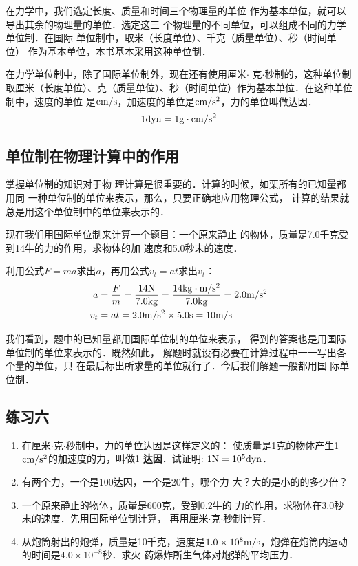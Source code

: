 在力学中，我们选定长度、质量和时间三个物理量的单位
作为基本单位，就可以导出其余的物理量的单位．选定这三
个物理量的不同单位，可以组成不同的力学单位制．在国际
单位制中，取米（长度单位）、千克（质量单位）、秒（时间单位）
作为基本单位，本书基本采用这种单位制．

在力学单位制中，除了国际单位制外，现在还有使用厘米$\cdot$
克$\cdot$秒制的，这种单位制取厘米（长度单位）、克（质量单位）、秒（时间单位）作为基本单位．在这种单位制中，速度的单位
是${\rm cm}/{\rm s}$，加速度的单位是${\rm cm}/{\rm s}^2$，力的单位叫做达因．
\[1{\rm dyn}=1{\rm g}\cdot {\rm cm}/{\rm s}^2  \]


\subsection{单位制在物理计算中的作用}
掌握单位制的知识对于物
理计算是很重要的．计算的时候，如栗所有的已知量都用同
一种单位制的单位来表示，那么，只要正确地应用物理公式，
计算的结果就总是用这个单位制中的单位来表示的．

现在我们用国际单位制来计算一个题目：一个原来静止
的物体，质量是7.0千克受到14牛的力的作用，求物体的加
速度和5.0秒末的速度．

利用公式$F= ma$求出$a$，再用公式$v_t= at$求出$v_t$：
\[\begin{split}
a&=\frac{F}{m}=\frac{14{\rm N}}{7.0{\rm kg}}=\frac{14{\rm kg}\cdot \text{m}/\text{s}^2}{7.0{\rm kg}}=2.0\text{m}/\text{s}^2\\
v_t&=at=2.0\text{m}/\text{s}^2 \times 5.0{\rm s}=10\text{m}/\text{s}
\end{split} \]

我们看到，题中的已知量都用国际单位制的单位来表示，
得到的答案也是用国际单位制的单位来表示的．既然如此，
解题时就设有必要在计算过程中一一写出各个量的单位，只
在最后标出所求量的单位就行了．今后我们解题一般都用国
际单位制．


\subsection*{练习六}
\begin{enumerate}
\item 在厘米$\cdot$克$\cdot$秒制中，力的单位达因是这样定义的：
使质量是1克的物体产生1${\rm cm}/{\rm s^2}$的加速度的力，叫做1
\textbf{达因}．试证明: $1{\rm N}=10^5{\rm dyn}$．
\item 有两个力，一个是100达因，一个是20牛，哪个力
大？大的是小的的多少倍？
\item 一个原来静止的物体，质量是600克，受到0.2牛的
力的作用，求物体在3.0秒末的速度．先用国际单位制计算，
再用厘米$\cdot$克$\cdot$秒制计算．
\item 从炮筒射出的炮弹，质量是10千克，速度是$1.0\times 
10^8\text{m}/\text{s}$，炮弹在炮筒内运动的时间是$4.0\times 10^{-8}$秒．求火
药爆炸所生气体对炮弹的平均压力．

\end{enumerate}

